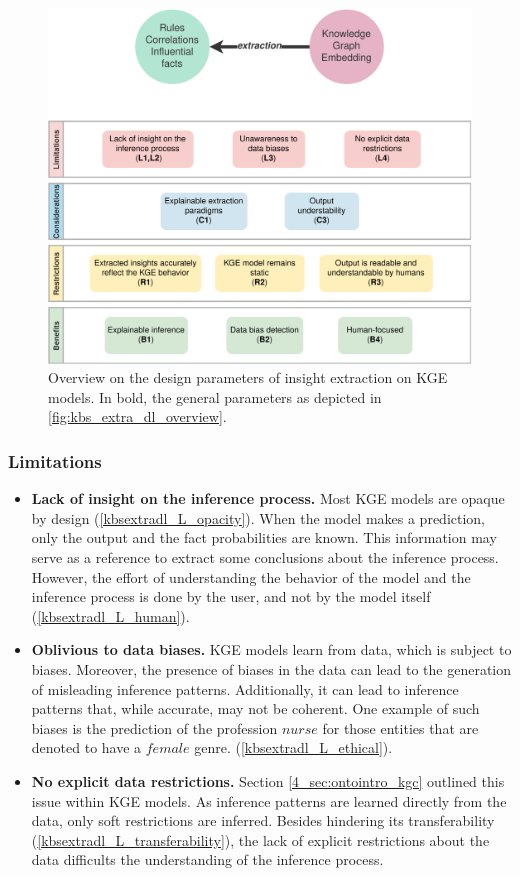 \begin{figure}[t]
    \centering
    \includegraphics[width=\linewidth]{6_kbsextractiondl/figures/Instance_GENI_extraction_DL.eps}
    \caption{Overview on the design parameters of insight extraction on KGE models. In bold, the general parameters as depicted in \ref{fig:kbs_extra_dl_overview}.}
    \label{fig:design_compliance_geni}
\end{figure}

\subsubsection*{Limitations}
\begin{itemize}
    \item \textbf{Lack of insight on the inference process.} Most KGE models are opaque by design (\ref{kbsextradl_L_opacity}). When the model makes a prediction, only the output and the fact probabilities are known. This information may serve as a reference to extract some conclusions about the inference process. However, the effort of understanding the behavior of the model and the inference process is done by the user, and not by the model itself (\ref{kbsextradl_L_human}).
    
    \item \textbf{Oblivious to data biases.} KGE models learn from data, which is subject to biases. Moreover, the presence of biases in the data can lead to the generation of misleading inference patterns. Additionally, it can lead to inference patterns that, while accurate, may not be coherent. One example of such biases is the prediction of the profession $nurse$ for those entities that are denoted to have a $female$ genre. (\ref{kbsextradl_L_ethical}). 
    
    \item \textbf{No explicit data restrictions.} Section \ref{4_sec:ontointro_kgc} outlined this issue within KGE models. As inference patterns are learned directly from the data, only soft restrictions are inferred. Besides hindering its transferability (\ref{kbsextradl_L_transferability}), the lack of explicit restrictions about the data difficults the understanding of the inference process.
\end{itemize}

